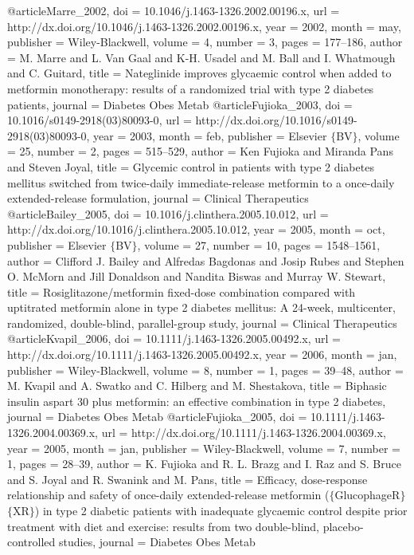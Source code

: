 @article{Marre_2002,
	doi = {10.1046/j.1463-1326.2002.00196.x},
	url = {http://dx.doi.org/10.1046/j.1463-1326.2002.00196.x},
	year = 2002,
	month = {may},
	publisher = {Wiley-Blackwell},
	volume = {4},
	number = {3},
	pages = {177--186},
	author = {M. Marre and L. Van Gaal and K-H. Usadel and M. Ball and I. Whatmough and C. Guitard},
	title = {Nateglinide improves glycaemic control when added to metformin monotherapy: results of a randomized trial with type 2 diabetes patients},
	journal = {Diabetes Obes Metab}
}
@article{Fujioka_2003,
	doi = {10.1016/s0149-2918(03)80093-0},
	url = {http://dx.doi.org/10.1016/s0149-2918(03)80093-0},
	year = 2003,
	month = {feb},
	publisher = {Elsevier $\lbrace$BV$\rbrace$},
	volume = {25},
	number = {2},
	pages = {515--529},
	author = {Ken Fujioka and Miranda Pans and Steven Joyal},
	title = {Glycemic control in patients with type 2 diabetes mellitus switched from twice-daily immediate-release metformin to a once-daily extended-release formulation},
	journal = {Clinical Therapeutics}
}
@article{Bailey_2005,
	doi = {10.1016/j.clinthera.2005.10.012},
	url = {http://dx.doi.org/10.1016/j.clinthera.2005.10.012},
	year = 2005,
	month = {oct},
	publisher = {Elsevier $\lbrace$BV$\rbrace$},
	volume = {27},
	number = {10},
	pages = {1548--1561},
	author = {Clifford J. Bailey and Alfredas Bagdonas and Josip Rubes and Stephen O. McMorn and Jill Donaldson and Nandita Biswas and Murray W. Stewart},
	title = {Rosiglitazone/metformin fixed-dose combination compared with uptitrated metformin alone in type 2 diabetes mellitus: A 24-week, multicenter, randomized, double-blind, parallel-group study},
	journal = {Clinical Therapeutics}
}
@article{Kvapil_2006,
	doi = {10.1111/j.1463-1326.2005.00492.x},
	url = {http://dx.doi.org/10.1111/j.1463-1326.2005.00492.x},
	year = 2006,
	month = {jan},
	publisher = {Wiley-Blackwell},
	volume = {8},
	number = {1},
	pages = {39--48},
	author = {M. Kvapil and A. Swatko and C. Hilberg and M. Shestakova},
	title = {Biphasic insulin aspart 30 plus metformin: an effective combination in type 2 diabetes},
	journal = {Diabetes Obes Metab}
}
@article{Fujioka_2005,
	doi = {10.1111/j.1463-1326.2004.00369.x},
	url = {http://dx.doi.org/10.1111/j.1463-1326.2004.00369.x},
	year = 2005,
	month = {jan},
	publisher = {Wiley-Blackwell},
	volume = {7},
	number = {1},
	pages = {28--39},
	author = {K. Fujioka and R. L. Brazg and I. Raz and S. Bruce and S. Joyal and R. Swanink and M. Pans},
	title = {Efficacy, dose-response relationship and safety of once-daily extended-release metformin ($\lbrace$GlucophageR$\rbrace$ $\lbrace$XR$\rbrace$) in type 2 diabetic patients with inadequate glycaemic control despite prior treatment with diet and exercise: results from two double-blind, placebo-controlled studies},
	journal = {Diabetes Obes Metab}
}
